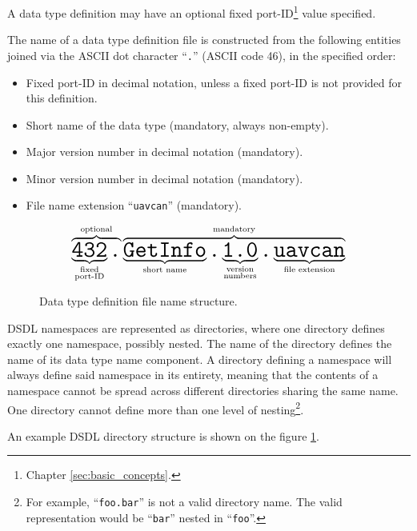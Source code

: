 A data type definition may have an optional fixed port-ID\footnote{Chapter \ref{sec:basic_concepts}.} value specified.

The name of a data type definition file is constructed from the following entities
joined via the ASCII dot character ``\verb|.|'' (ASCII code 46), in the specified order:
\begin{itemize}
    \item Fixed port-ID in decimal notation, unless a fixed port-ID is not provided for this definition.
    \item Short name of the data type (mandatory, always non-empty).
    \item Major version number in decimal notation (mandatory).
    \item Minor version number in decimal notation (mandatory).
    \item File name extension ``\verb|uavcan|'' (mandatory).
\end{itemize}

\begin{figure}[H]
    $$
    \overbrace{%
        \underbrace{\texttt{\huge{432}}}_{\substack{\text{fixed} \\ \text{port-ID}}}%
        \texttt{\huge{.}}%
    }^{\text{optional}}%
    \overbrace{%
        \underbrace{\texttt{\huge{GetInfo}}}_{\substack{\text{short name}}}%
        \texttt{\huge{.}}%
        \underbrace{\texttt{\huge{1.0}}}_{\substack{\text{version} \\ \text{numbers}}}%
        \texttt{\huge{.}}%
        \underbrace{\texttt{\huge{uavcan}}}_{\text{file extension}}%
    }^{\text{mandatory}}
    $$
    \caption{Data type definition file name structure.\label{fig:dsdl_definition_file_name_structure}}
\end{figure}

DSDL namespaces are represented as directories, where one directory defines exactly one namespace, possibly nested.
The name of the directory defines the name of its data type name component.
A directory defining a namespace will always define said namespace in its entirety,
meaning that the contents of a namespace cannot be spread across different directories sharing the same name.
One directory cannot define more than one level of
nesting\footnote{For example, ``\texttt{foo.bar}'' is not a valid directory name.
The valid representation would be ``\texttt{bar}'' nested in ``\texttt{foo}''.}.

An example DSDL directory structure is shown on the figure \ref{fig:dsdl_definition_file_name_structure}.

